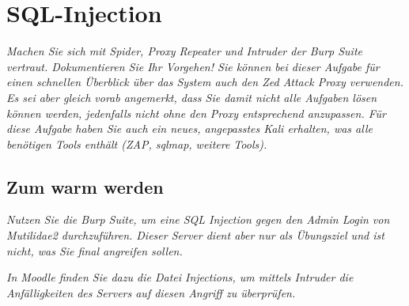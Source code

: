 \section{SQL-Injection}
\textit{Machen Sie sich mit Spider, Proxy Repeater und Intruder der Burp Suite vertraut. Dokumentieren Sie Ihr Vorgehen! Sie können bei dieser Aufgabe für einen schnellen Überblick über das System auch den Zed Attack Proxy verwenden. Es sei aber gleich vorab angemerkt, dass Sie damit nicht alle Aufgaben lösen können werden, jedenfalls nicht ohne den Proxy entsprechend anzupassen. Für diese Aufgabe
haben Sie auch ein neues, angepasstes Kali erhalten, was alle benötigen Tools enthält (ZAP, sqlmap, weitere Tools).}

\subsection{Zum warm werden}
\textit{Nutzen Sie die Burp Suite, um eine SQL Injection gegen den Admin Login von Mutilidae2 durchzuführen. Dieser Server dient aber nur als Übungsziel und ist nicht, was Sie final angreifen sollen.}

\textit{In Moodle finden Sie dazu die Datei Injections, um mittels Intruder die Anfälligkeiten des Servers auf diesen Angriff zu überprüfen.}\\


